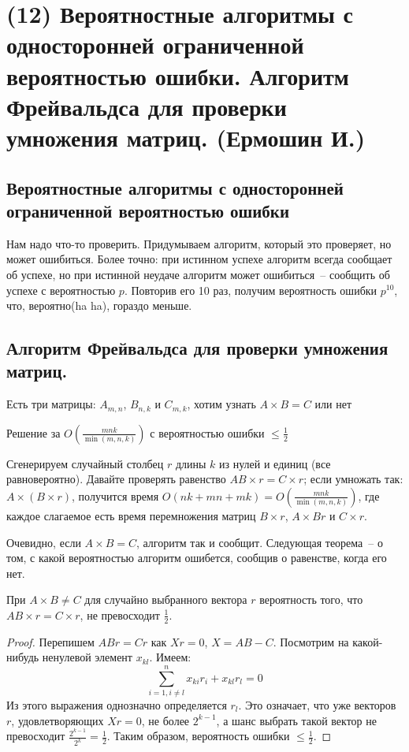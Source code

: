 \hypertarget{Freivalds}{}
\section{(12) Вероятностные алгоритмы с односторонней ограниченной вероятностью ошибки. Алгоритм Фрейвальдса для проверки умножения матриц. (Ермошин И.)}

\subsection{Вероятностные алгоритмы с односторонней ограниченной вероятностью ошибки}

Нам надо что-то проверить. Придумываем алгоритм, который это проверяет, но может ошибиться. Более точно: при истинном успехе алгоритм всегда сообщает об успехе, но при истинной неудаче алгоритм может ошибиться~-- сообщить об успехе с вероятностью $p$. Повторив его 10 раз, получим вероятность ошибки $p^{10}$, что, вероятно(ha ha), гораздо меньше.

\subsection{Алгоритм Фрейвальдса для проверки умножения матриц.}

Есть три матрицы: $A_{m,n}$, $B_{n,k}$ и $C_{m,k}$, хотим узнать $A\times B=C$ или нет

\begin{algodescription}{Решение за $O\left(\frac{mnk}{\min(m,n,k)}\right)$ с вероятностью ошибки $\le\frac{1}{2}$}


Сгенерируем случайный столбец $r$ длины $k$ из нулей и единиц (все равновероятно). Давайте проверять равенство $AB\times r=C\times r$; если умножать так: $A\times (B\times r)$, получится время $O(nk+mn+mk)=O\left(\frac{mnk}{\min(m,n,k)}\right)$, где каждое слагаемое есть время перемножения матриц $B\times r$, $A \times Br$ и $C\times r$.
\end{algodescription}

Очевидно, если $A\times B=C$, алгоритм так и сообщит. Следующая теорема~-- о том, с какой вероятностью алгоритм ошибется, сообщив о равенстве, когда его нет.

\begin{theorem*} 
    При $A\times B \neq C$ для случайно выбранного вектора $r$ вероятность того, что $AB\times r = C\times r$, не превосходит $\frac{1}{2}$.
\end{theorem*}
\begin{proof}
Перепишем $ABr = Cr$ как $Xr=0$, $X=AB-C$. Посмотрим на какой-нибудь ненулевой элемент $x_{kl}$. Имеем:
$$\sum_{i=1, i\ne l}^{n} x_{ki}r_i+x_{kl}r_l=0$$
Из этого выражения однозначно определяется $r_l$. Это означает, что уже векторов $r$, удовлетворяющих $Xr=0$, не более $2^{k-1}$, а шанс выбрать такой вектор не превосходит $\frac{2^{k-1}}{2^k} = \frac{1}{2}$. Таким образом, вероятность ошибки $\le\frac{1}{2}$. \end{proof}
